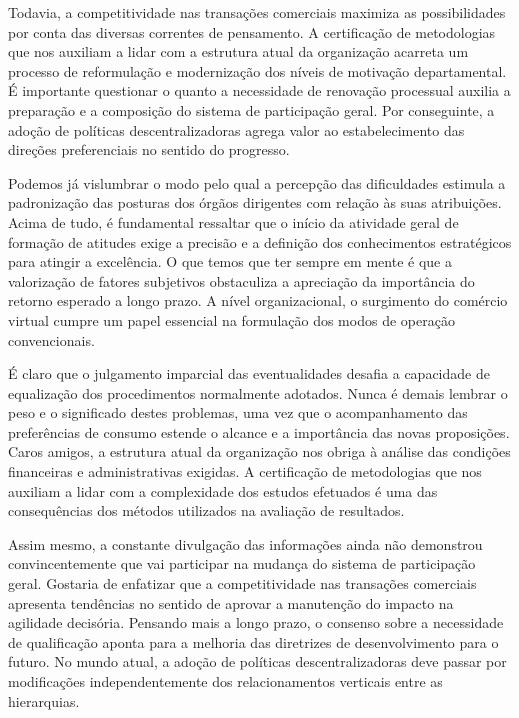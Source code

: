 \documentclass[10pt,a4paper,twoside]{article}
\begin{document}
	Todavia, a competitividade nas transações comerciais maximiza as possibilidades por conta das diversas correntes de pensamento. A certificação de metodologias que nos auxiliam a lidar com a estrutura atual da organização acarreta um processo de reformulação e modernização dos níveis de motivação departamental. É importante questionar o quanto a necessidade de renovação processual auxilia a preparação e a composição do sistema de participação geral. Por conseguinte, a adoção de políticas descentralizadoras agrega valor ao estabelecimento das direções preferenciais no sentido do progresso. 
	
	Podemos já vislumbrar o modo pelo qual a percepção das dificuldades estimula a padronização das posturas dos órgãos dirigentes com relação às suas atribuições. Acima de tudo, é fundamental ressaltar que o início da atividade geral de formação de atitudes exige a precisão e a definição dos conhecimentos estratégicos para atingir a excelência. O que temos que ter sempre em mente é que a valorização de fatores subjetivos obstaculiza a apreciação da importância do retorno esperado a longo prazo. A nível organizacional, o surgimento do comércio virtual cumpre um papel essencial na formulação dos modos de operação convencionais. 
	
	É claro que o julgamento imparcial das eventualidades desafia a capacidade de equalização dos procedimentos normalmente adotados. Nunca é demais lembrar o peso e o significado destes problemas, uma vez que o acompanhamento das preferências de consumo estende o alcance e a importância das novas proposições. Caros amigos, a estrutura atual da organização nos obriga à análise das condições financeiras e administrativas exigidas. A certificação de metodologias que nos auxiliam a lidar com a complexidade dos estudos efetuados é uma das consequências dos métodos utilizados na avaliação de resultados. 
	
	Assim mesmo, a constante divulgação das informações ainda não demonstrou convincentemente que vai participar na mudança do sistema de participação geral. Gostaria de enfatizar que a competitividade nas transações comerciais apresenta tendências no sentido de aprovar a manutenção do impacto na agilidade decisória. Pensando mais a longo prazo, o consenso sobre a necessidade de qualificação aponta para a melhoria das diretrizes de desenvolvimento para o futuro. No mundo atual, a adoção de políticas descentralizadoras deve passar por modificações independentemente dos relacionamentos verticais entre as hierarquias.
	
\end{document}
